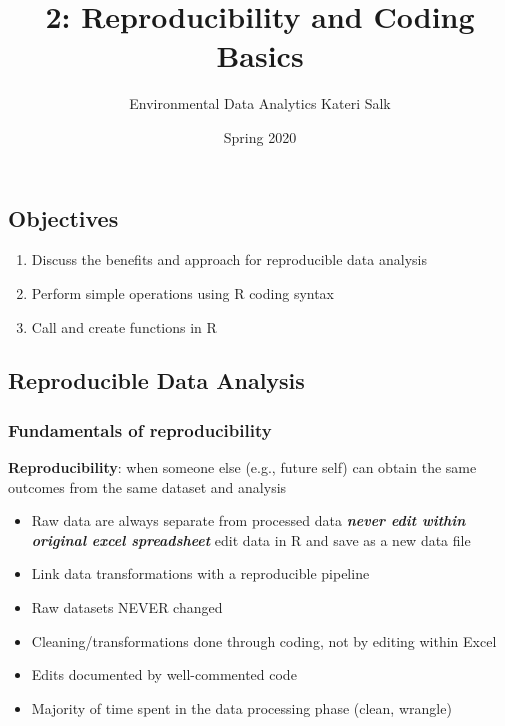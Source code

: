 \documentclass[
]{article}
\title{2: Reproducibility and Coding Basics}
\author{Environmental Data Analytics \textbar{} Kateri Salk}
\date{Spring 2020}
\providecommand{\tightlist}{%
  \setlength{\itemsep}{0pt}\setlength{\parskip}{0pt}}
\begin{document}
\maketitle

\hypertarget{objectives}{%
\subsection{Objectives}\label{objectives}}

\begin{enumerate}
\def\labelenumi{\arabic{enumi}.}
\tightlist
\item
  Discuss the benefits and approach for reproducible data analysis
\item
  Perform simple operations using R coding syntax
\item
  Call and create functions in R
\end{enumerate}

\hypertarget{reproducible-data-analysis}{%
\subsection{Reproducible Data
Analysis}\label{reproducible-data-analysis}}

\hypertarget{fundamentals-of-reproducibility}{%
\subsubsection{Fundamentals of
reproducibility}\label{fundamentals-of-reproducibility}}

\textbf{Reproducibility}: when someone else (e.g., future self) can
obtain the same outcomes from the same dataset and analysis

\begin{itemize}
\tightlist
\item
  Raw data are always separate from processed data \textbf{\emph{never
  edit within original excel spreadsheet }}edit data in R and save as a
  new data file
\item
  Link data transformations with a reproducible pipeline
\item
  Raw datasets NEVER changed
\item
  Cleaning/transformations done through coding, not by editing within
  Excel
\item
  Edits documented by well-commented code
\item
  Majority of time spent in the data processing phase (clean, wrangle)
\end{itemize}
\end{document}
